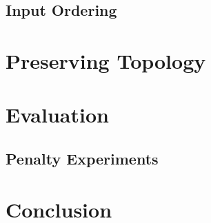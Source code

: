 \documentclass{sig-alternate-sigmod09}
\begin{document}
\subsection{Input Ordering}

\section{Preserving Topology}

\section{Evaluation}

\subsection{Penalty Experiments}

\section{Conclusion}

\balancecolumns
\end{document}
